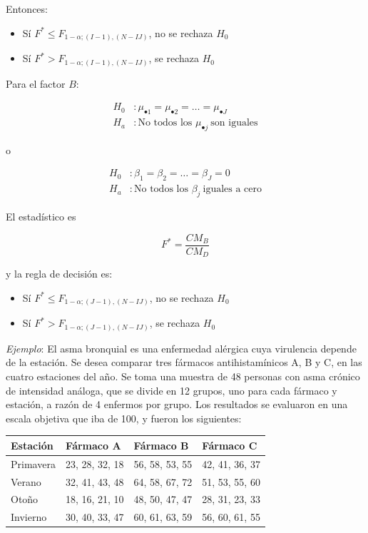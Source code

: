 \documentclass[]{book}
\theoremstyle{definition}
\theoremstyle{definition}
\theoremstyle{definition}
\theoremstyle{remark}
\begin{document}
Entonces:

\begin{itemize}
\item
  Sí
  \(F^{*} \leq F_{1 - \alpha;\left( I-1 \right),\left( N-IJ \right)}\),
  no se rechaza \(H_{0}\)
\item
  Sí \(F^{*} > F_{1 - \alpha;\left( I-1 \right),\left( N-IJ \right)}\),
  se rechaza \(H_{0}\)
\end{itemize}

Para el factor \(B\):

\[
\begin{aligned}
H_{0}&:\mu_{\bullet 1} = \mu_{\bullet 2} = \ldots = \mu_{\bullet J}\\
H_{a}&: \text{No todos los } \mu_{\bullet j}\ \text{son iguales}
\end{aligned}
\]

o

\[
\begin{aligned}
H_{0}&:\beta_{1} = \beta_{2} = \ldots = \beta_{J} = 0\\
H_{a}&:\text{No todos los } \beta_{j}\ \text{iguales a cero}
\end{aligned}
\]

El estadístico es

\[
F^{*} = \frac{CM_{B}}{CM_{D}}
\]

y la regla de decisión es:

\begin{itemize}
\item
  Sí
  \(F^{*} \leq F_{1 - \alpha;\left( J-1 \right),\left( N- IJ\right)}\),
  no se rechaza \(H_{0}\)
\item
  Sí \(F^{*} > F_{1 - \alpha;\left( J-1 \right),\left( N- IJ\right)}\),
  se rechaza \(H_{0}\)
\end{itemize}

\emph{Ejemplo}: El asma bronquial es una enfermedad alérgica cuya
virulencia depende de la estación. Se desea comparar tres fármacos
antihistamínicos A, B y C, en las cuatro estaciones del año. Se toma una
muestra de 48 personas con asma crónico de intensidad análoga, que se
divide en 12 grupos, uno para cada fármaco y estación, a razón de 4
enfermos por grupo. Los resultados se evaluaron en una escala objetiva
que iba de 100, y fueron los siguientes:

\begin{longtable}[]{@{}llll@{}}
\toprule
Estación & Fármaco A & Fármaco B & Fármaco C\tabularnewline
\midrule
\endhead
Primavera & 23, 28, 32, 18 & 56, 58, 53, 55 & 42, 41, 36,
37\tabularnewline
Verano & 32, 41, 43, 48 & 64, 58, 67, 72 & 51, 53, 55, 60\tabularnewline
Otoño & 18, 16, 21, 10 & 48, 50, 47, 47 & 28, 31, 23, 33\tabularnewline
Invierno & 30, 40, 33, 47 & 60, 61, 63, 59 & 56, 60, 61,
55\tabularnewline
\bottomrule
\end{longtable}
\end{document}
